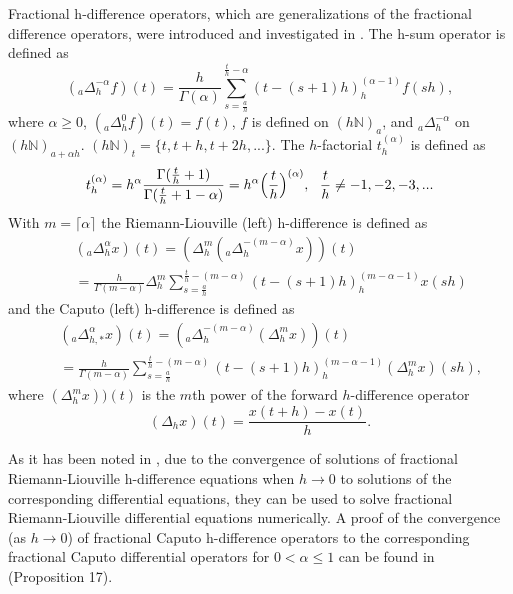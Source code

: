 \documentclass[graybox]{svmult}
\begin{document}
Fractional h-difference operators, which are generalizations of the fractional difference operators, were introduced and investigated in \cite{hdif1,hdif2,hdif3,hdif4,hdif4n,hdif5,hdif6}. 
The h-sum operator is defined as
\begin{equation}
(_a\Delta^{-\alpha}_{h}f)(t)=\frac{h}{\Gamma(\alpha)} \sum^{\frac{t}{h}-\alpha}_{s=\frac{a}{h}}(t-(s+1)h)^{(\alpha-1)}_h f(sh),
\label{hSum}
\end{equation}
where $\alpha \ge 0$, $(_a\Delta^{0}_{h}f)(t)=f(t)$, $f$ is defined on
$(h\mathbb{N})_a$, and $_a\Delta^{-\alpha}_h$ on  
$(h\mathbb{N})_{a+\alpha h}$. $(h\mathbb{N})_t=\{t,t+h, t+2h, ...\}$.
The $h$-factorial $t^{(\alpha)}_h$ is defined as
\begin{equation}
t^{(\alpha)}_h =h^{\alpha}\frac{\Gamma(\frac{t}{h}+1)}{\Gamma(\frac{t}{h}+1-\alpha)}= h^{\alpha}\Bigl(\frac{t}{h}\Bigr)^{(\alpha)}, \ \ \frac{t}{h} \ne -1, -2, -3,
...
\label{hFrFac}
\end{equation}
With $m=\lceil \alpha \rceil$   the Riemann-Liouville (left) h-difference is defined as
{\setlength\arraycolsep{0.5pt}
\begin{eqnarray}
&&(_a\Delta^{\alpha}_h x)(t) =  (\Delta^{m}_h
(_a\Delta^{-(m-\alpha)}_{h}x))(t) \nonumber \\  
&&=\frac{h}{\Gamma(m-\alpha)} \Delta^m_h \sum^{\frac{t}{h}-(m-\alpha)}_{s=\frac{a}{h}}(t-(s+1)h)^{(m-\alpha-1)}_h 
x(sh)
\label{hFDRL}
\end{eqnarray}
}
and  the Caputo (left) h-difference is defined as
{\setlength\arraycolsep{0.5pt}
\begin{eqnarray}
&&(_a\Delta^{\alpha}_{h,*} x)(t) =  
(_a\Delta^{-(m-\alpha)}_h (\Delta^{m}_{h}x))(t) \nonumber \\  
&&=\frac{h}{\Gamma(m-\alpha)} \sum^{\frac{t}{h}-(m-\alpha)}_{s=\frac{a}{h}}(t-(s+1)h)^{(m-\alpha-1)}_h 
(\Delta^m_hx)(sh),
\label{hFDC}
\end{eqnarray}
}
where $(\Delta^{m}_{h}x))(t)$ is the $m$th power of the forward $h$-difference operator 
\begin{equation} 
(\Delta_{h}x)(t)=\frac{x(t+h)-x(t)}{h}.
\label{FHD}
\end{equation} 

As it has been noted in \cite{hdif1,hdif3,hdif3n}, due to the convergence of
solutions of fractional Riemann-Liouville h-difference equations 
when $h \rightarrow 0$ to 
solutions of the corresponding differential 
equations,  they can be used
to solve fractional Riemann-Liouville differential equations
numerically. A proof of the convergence (as $h \rightarrow 0$) of   
fractional Caputo h-difference operators to the corresponding  
fractional Caputo differential  operators for $0 < \alpha \le 1$ can be
found in \cite{hdif4n} (Proposition 17).
\end{document}
